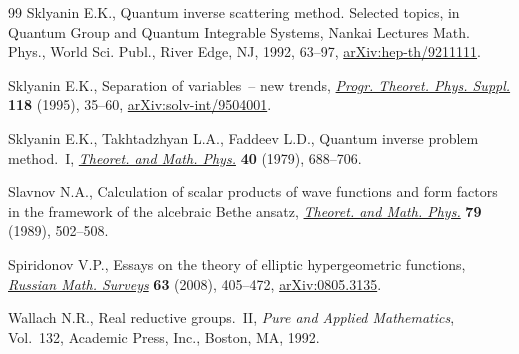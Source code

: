 \documentclass[pdftex]{sigma}%
\numberwithin{equation}{section}
\begin{document}
\begin{thebibliography}{99}
Sklyanin E.K., Quantum inverse scattering method. {S}elected topics, in Quantum
 Group and Quantum Integrable Systems, Nankai Lectures Math. Phys., World Sci.
 Publ., River Edge, NJ, 1992, 63--97, \href{https://arxiv.org/abs/hep-th/9211111}{arXiv:hep-th/9211111}.

Sklyanin E.K., Separation of variables~-- new trends, \href{https://doi.org/10.1143/PTPS.118.35}{\textit{Progr. Theoret.
 Phys. Suppl.}} \textbf{118} (1995), 35--60, \href{https://arxiv.org/abs/solv-int/9504001}{arXiv:solv-int/9504001}.

Sklyanin E.K., Takhtadzhyan L.A., Faddeev L.D., Quantum inverse problem
 method.~{I}, \href{https://doi.org/10.1007/BF01018718}{\textit{Theoret. and Math. Phys.}} \textbf{40} (1979), 688--706.

Slavnov N.A., Calculation of scalar products of wave functions and form factors
 in the framework of the alcebraic {B}ethe ansatz, \href{https://doi.org/10.1007/BF01016531}{\textit{Theoret. and Math.
 Phys.}} \textbf{79} (1989), 502--508.

Spiridonov V.P., Essays on the theory of elliptic hypergeometric functions,
 \href{https://doi.org/10.1070/RM2008v063n03ABEH004533}{\textit{Russian Math. Surveys}} \textbf{63} (2008), 405--472,
 \href{https://arxiv.org/abs/0805.3135}{arXiv:0805.3135}.

Wallach N.R., Real reductive groups.~{II}, \textit{Pure and Applied
 Mathematics}, Vol.~132, Academic Press, Inc., Boston, MA, 1992.

\end{thebibliography}\LastPageEnding
\end{document}
